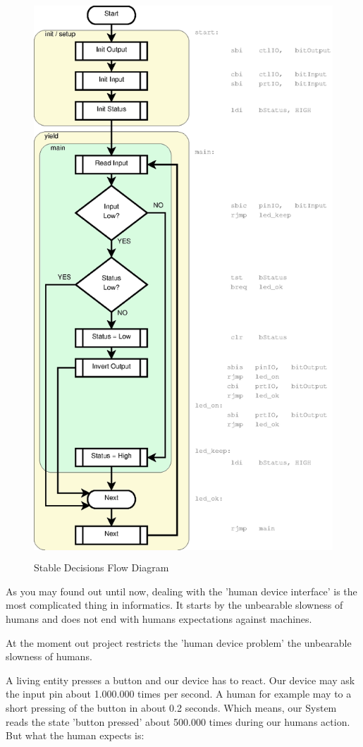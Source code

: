 \begin{figure}[htbp]
  \centering
  \includegraphics[height=210mm]{LED/S005_stable-decisions+symbols.eps}
  \caption{Stable Decisions Flow Diagram}
  \label{S005FlowDiagam}
\end{figure}

As you may found out until now, dealing with the 'human device interface' is the most complicated thing in informatics. It starts by the unbearable slowness of humans and does not end with humans expectations against machines.

At the moment out project restricts the 'human device problem' the unbearable slowness of humans.

A living entity presses a button and our device has to react. Our device may ask the input pin about 1.000.000 times per second. A human for example may to a short pressing of the button in about 0.2 seconds. Which means, our System reads the state 'button pressed' about 500.000 times during our humans action. But what the human expects is:

